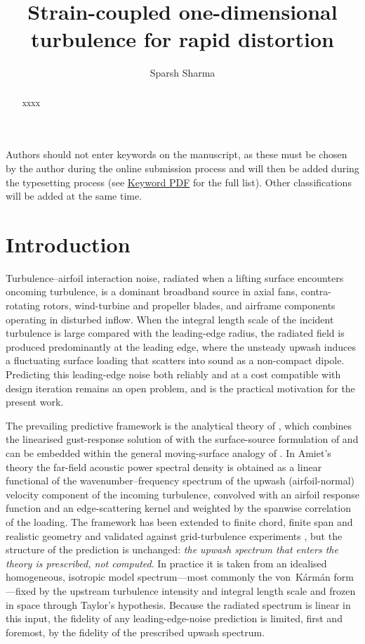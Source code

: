\documentclass[lineno]{JFM-FLM_Au}
\title{Strain-coupled one-dimensional turbulence for rapid distortion}
\author{Sparsh Sharma\aff{1}}
\affiliation{\aff{1}German Aerospace Center (DLR), 38108 Braunschweig, Germany}
\begin{document}
\maketitle

\begin{abstract}
xxxx
\end{abstract}

\begin{keywords}
Authors should not enter keywords on the manuscript, as these must be chosen by the author during the online submission process and will then be added during the typesetting process (see \href{https://www.cambridge.org/core/services/aop-file-manager/file/61436b61ff7f3cfab749ce3a/JFM-Keywords-Sept-2021.pdf.}{Keyword PDF} for the full list).  Other classifications will be added at the same time.
\end{keywords}

\section{Introduction}\label{sec:intro}

Turbulence--airfoil interaction noise, radiated when a lifting surface
encounters oncoming turbulence, is a dominant broadband source in axial
fans, contra-rotating rotors, wind-turbine and propeller blades, and
airframe components operating in disturbed inflow. When the integral
length scale of the incident turbulence is large compared with the
leading-edge radius, the radiated field is produced predominantly at the
leading edge, where the unsteady upwash induces a fluctuating surface
loading that scatters into sound as a non-compact dipole. Predicting this
leading-edge noise both reliably and at a cost compatible with design
iteration remains an open problem, and is the practical motivation for the
present work.

The prevailing predictive framework is the analytical theory of
\citet{Amiet1975}, which combines the linearised gust-response solution of
\citet{Sears1941} with the surface-source formulation of \citet{Curle1955}
and can be embedded within the general moving-surface analogy of
\citet{FfowcsWilliams1969}. In Amiet's theory the far-field acoustic
power spectral density is obtained as a linear functional of the
wavenumber--frequency spectrum of the upwash (airfoil-normal) velocity
component of the incoming turbulence, convolved with an airfoil response
function and an edge-scattering kernel and weighted by the spanwise
correlation of the loading. The framework has been extended to finite
chord, finite span and realistic geometry and validated against
grid-turbulence experiments \citep{PatersonAmiet1977,RogerMoreau2010},
but the structure of the prediction is unchanged: \emph{the upwash
spectrum that enters the theory is prescribed, not computed}. In practice
it is taken from an idealised homogeneous, isotropic model spectrum---most
commonly the von~K\'arm\'an form \citep{vonKarman1948}---fixed by the
upstream turbulence intensity and integral length scale and frozen in
space through Taylor's hypothesis. Because the radiated spectrum is linear
in this input, the fidelity of any leading-edge-noise prediction is
limited, first and foremost, by the fidelity of the prescribed upwash
spectrum.
\end{document}
